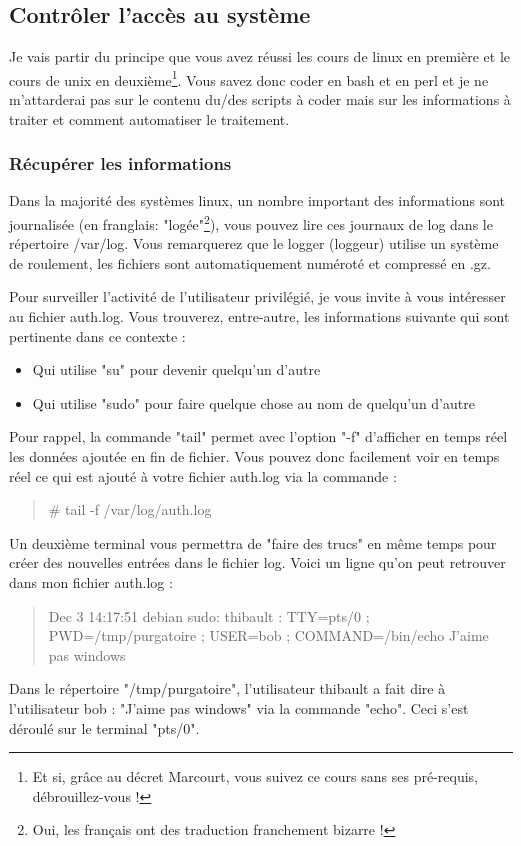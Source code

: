 \documentclass[a4paper]{article}
\newcommand{\commande}[1] {
    \begin{quote}
    \tt\raggedright #1 
    \end{quote}
}
\begin{document}
\subsection{Contrôler l'accès au système}
\par Je vais partir du principe que vous avez réussi les cours de linux en première et le cours de unix en deuxième\footnote{Et si, grâce au décret Marcourt, vous suivez ce cours sans ses pré-requis, débrouillez-vous !}. Vous savez donc coder en bash et en perl et je ne m'attarderai pas sur le contenu du/des scripts à coder mais sur les informations à traiter et comment automatiser le traitement.

\subsubsection{Récupérer les informations}
\par Dans la majorité des systèmes linux, un nombre important des informations sont journalisée (en franglais: "logée"\footnote{Oui, les français ont des traduction franchement bizarre !}), vous pouvez lire ces journaux de log dans le répertoire /var/log. Vous remarquerez que le logger (loggeur) utilise un système de roulement, les fichiers sont automatiquement numéroté et compressé en .gz.
\par Pour surveiller l'activité de l'utilisateur privilégié, je vous invite à vous intéresser au fichier auth.log. Vous trouverez, entre-autre, les informations suivante qui sont pertinente dans ce contexte :
\begin{itemize}
    \item Qui utilise "su" pour devenir quelqu'un d'autre
    \item Qui utilise "sudo" pour faire quelque chose au nom de quelqu'un d'autre
\end{itemize}
\par Pour rappel, la commande "tail" permet avec l'option "-f" d'afficher en temps réel les données ajoutée en fin de fichier. Vous pouvez donc facilement voir en temps réel ce qui est ajouté à votre fichier auth.log via la commande :
\commande{\# tail -f /var/log/auth.log}
\par Un deuxième terminal vous permettra de "faire des trucs" en même temps pour créer des nouvelles entrées dans le fichier log. Voici un ligne qu'on peut retrouver dans mon fichier auth.log :
\commande{Dec 3 14:17:51 debian sudo:  thibault : TTY=pts/0 ; PWD=/tmp/purgatoire ; USER=bob ; COMMAND=/bin/echo J'aime pas windows}
\par Dans le répertoire "/tmp/purgatoire", l'utilisateur thibault a fait dire à l'utilisateur bob : "J'aime pas windows" via la commande "echo". Ceci s'est déroulé sur le terminal "pts/0".
\end{document}
